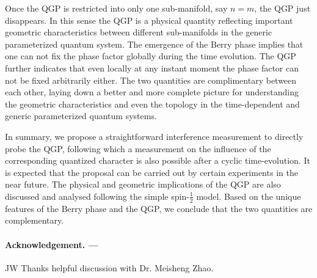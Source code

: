 \documentclass[aps,pra,twocolumn,
groupedaddress,10pt]{revtex4}
\begin{document}
Once the QGP is restricted into only one sub-manifold, say $n=m$, the QGP
just disappears. In this sense the QGP is a physical quantity reflecting
important geometric characteristics between different sub-manifolds in
the generic parameterized quantum system.
The emergence of the Berry phase implies that one
can not fix the phase factor globally during the time evolution.
The QGP further indicates that even locally at any instant
moment the phase factor can not be fixed arbitrarily either. The two
quantities are complimentary between each other, laying down a better
and more complete picture for understanding the
geometric characteristics and even the topology in the
time-dependent and generic parameterized
quantum systems.

In summary, we propose a straightforward interference measurement
to directly probe the QGP, following which a measurement on the
influence of the
corresponding quantized character is also possible after a cyclic
time-evolution. It is expected that the proposal
can be carried out by certain experiments in the near future. 
The physical and
geometric implications of the QGP are also discussed and analysed
following the simple spin-$\frac{1}{2}$ model. Based on the unique
features of the Berry phase and the QGP, we conclude that the two
quantities are complementary.

\paragraph*{Acknowledgement. ---}
JW Thanks helpful discussion with Dr. Meisheng Zhao.







\end{document}
